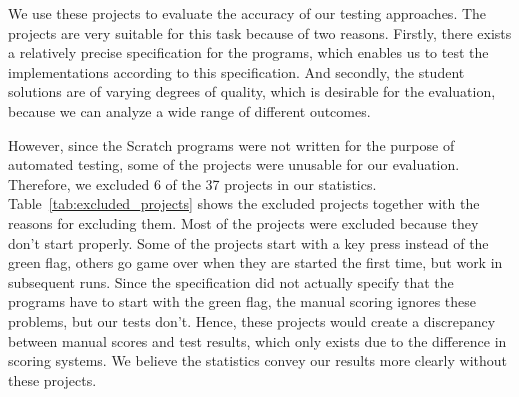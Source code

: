 We use these projects to evaluate the accuracy of our testing approaches.
The projects are very suitable for this task because of two reasons.
Firstly, there exists a relatively precise specification for the programs,
which enables us to test the implementations according to this specification.
And secondly, the student solutions are of varying degrees of quality,
which is desirable for the evaluation,
because we can analyze a wide range of different outcomes.
\parspace

However, since the Scratch programs were not written for the purpose of automated testing,
some of the projects were unusable for our evaluation.
Therefore, we excluded $6$ of the 37 projects in our statistics.
Table~\ref{tab:excluded_projects} shows the excluded projects together with the reasons for excluding them.
Most of the projects were excluded because they don't start properly.
Some of the projects start with a key press instead of the green flag,
others go game over when they are started the first time, but work in subsequent runs.
Since the specification did not actually specify that the programs have to start with the green flag,
the manual scoring ignores these problems, but our tests don't.
Hence, these projects would create a discrepancy between manual scores and test results,
which only exists due to the difference in scoring systems.
We believe the statistics convey our results more clearly without these projects.

